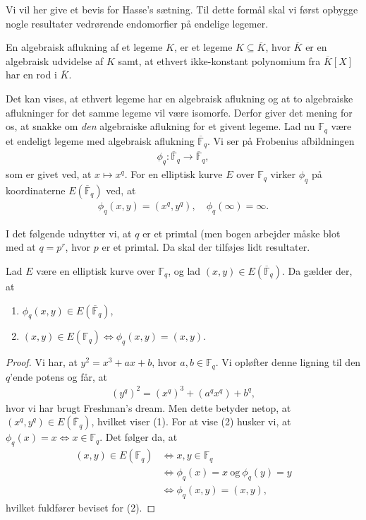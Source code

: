 Vi vil her give et bevis for Hasse's sætning. Til dette
formål skal vi først opbygge nogle resultater vedrørende
endomorfier på endelige legemer.

\begin{definition}
En algebraisk aflukning af et legeme $K$, er et legeme
$K \subseteq \overline{K}$, hvor $\overline{K}$ er en 
algebraisk udvidelse af $K$ samt, at ethvert ikke-konstant
polynomium fra $\overline{K}[X]$ har en rod i $\overline{K}$. 
\end{definition}

Det kan vises, at ethvert legeme har en algebraisk aflukning og
at to algebraiske aflukninger for det samme legeme vil være isomorfe.
Derfor giver det mening for os, at snakke om \emph{den} algebraiske
aflukning for et givent legeme. Lad nu $\mathbb{F}_q$ være et endeligt
legeme med algebraisk aflukning $\overline{\mathbb{F}}_q$. Vi ser på
Frobenius afbildningen 
\begin{align*}
	\phi_q : \overline{\mathbb{F}}_q \to \overline{\mathbb{F}}_q,
\end{align*}
som er givet ved, at $x \mapsto x^q$. For en elliptisk kurve $E$ over
$\mathbb{F}_q$ virker $\phi_q$ på koordinaterne $E(\overline{\mathbb{F}}_q)$ 
ved, at 
\begin{align*}
	\phi_q(x, y) = (x^q, y^q), \quad \phi_q (\infty) = \infty.
\end{align*}

I det følgende udnytter vi, at $q$ er et primtal (men bogen arbejder
måske blot med at $q = p^r$, hvor $p$ er et primtal. Da skal der tilføjes
lidt resultater.

\begin{lemma}
Lad $E$ være en elliptisk kurve over $\mathbb{F}_q$, og lad 
$(x, y) \in E(\overline{\mathbb{F}}_q)$. Da gælder der, at 
\begin{enumerate}
	\item $\phi_q(x, y) \in E(\overline{\mathbb{F}}_q)$,
	\item $(x, y) \in E(\mathbb{F}_q) \Leftrightarrow \phi_q(x, y)=(x, y)$.
\end{enumerate}
\end{lemma}
\begin{proof}
Vi har, at $y^2 = x^3 + ax + b$, hvor $a, b \in \mathbb{F}_q$. Vi opløfter 
denne ligning til den $q$'ende potens og får, at 
\begin{align*}
	(y^q)^2 = (x^q)^3 + (a^q x^q) + b^q,
\end{align*}
hvor vi har brugt Freshman's dream. Men dette betyder netop, at 
$(x^q, y^q) \in E(\overline{\mathbb{F}}_q)$, hvilket viser (1).
For at vise (2) husker vi, at $\phi_q(x) = x \Leftrightarrow x \in \mathbb{F}_q$.
Det følger da, at 
\begin{align*}
	(x, y) \in E(\mathbb{F}_q) &\Leftrightarrow x, y \in \mathbb{F}_q \\
	&\Leftrightarrow \phi_q(x) = x \ \text{og} \ \phi_q(y) = y \\
	&\Leftrightarrow \phi_q(x, y) = (x, y),
\end{align*}
hvilket fuldfører beviset for (2).
\end{proof}

